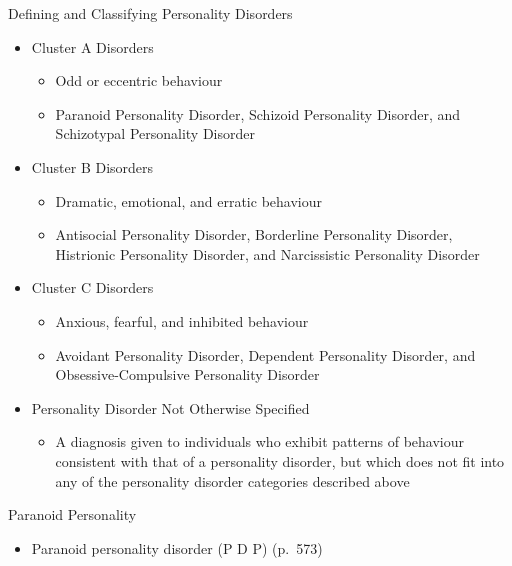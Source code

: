 \documentclass[
]{book}
\providecommand{\tightlist}{%
  \setlength{\itemsep}{0pt}\setlength{\parskip}{0pt}}
\begin{document}
\begin{reflect}
Defining and Classifying Personality Disorders

\begin{itemize}
\tightlist
\item
  Cluster A Disorders

  \begin{itemize}
  \tightlist
  \item
    Odd or eccentric behaviour\\
  \item
    Paranoid Personality Disorder, Schizoid Personality Disorder, and Schizotypal Personality Disorder\\
  \end{itemize}
\item
  Cluster B Disorders

  \begin{itemize}
  \tightlist
  \item
    Dramatic, emotional, and erratic behaviour\\
  \item
    Antisocial Personality Disorder, Borderline Personality Disorder, Histrionic Personality Disorder, and Narcissistic Personality Disorder\\
  \end{itemize}
\item
  Cluster C Disorders

  \begin{itemize}
  \tightlist
  \item
    Anxious, fearful, and inhibited behaviour\\
  \item
    Avoidant Personality Disorder, Dependent Personality Disorder, and Obsessive-Compulsive Personality Disorder\\
  \end{itemize}
\item
  Personality Disorder Not Otherwise Specified

  \begin{itemize}
  \tightlist
  \item
    A diagnosis given to individuals who exhibit patterns of behaviour consistent with that of a personality disorder, but which does not fit into any of the personality disorder categories described above
  \end{itemize}
\end{itemize}

Paranoid Personality

\begin{itemize}
\tightlist
\item
  Paranoid personality disorder (P D P) (p.~573)


\end{itemize}
\end{reflect}
\end{document}
